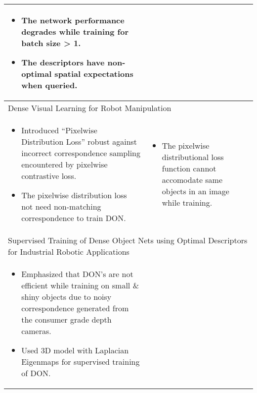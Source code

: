 \begin{longtable}{|p{7cm}|p{7cm}|}
\begin{itemize}
                                                                                                  \item The network performance degrades while training for batch size > 1.
                                                                                                  \item The descriptors have non-optimal spatial expectations when queried.
                                                                                              \end{itemize}                                                          \\ \hline
    \multicolumn{2}{m{14cm}}{\centering Dense Visual Learning for Robot Manipulation\cite{florence2020dense}}                                                                                                                   \\ \hline
    \begin{itemize}
        \itemsep0em
        \item Introduced ``Pixelwise Distribution Loss'' robust against incorrect correspondence sampling encountered by pixelwise contrastive loss.
        \item The pixelwise distribution loss not need non-matching correspondence to train \ac{DON}.
    \end{itemize}                             & \begin{itemize}
                                                    \itemsep0em
                                                    \item The pixelwise distributional loss function cannot accomodate same objects in an image while training.
                                                \end{itemize}                                                                      \\ \hline
    \multicolumn{2}{m{14cm}}{\centering Supervised Training of Dense Object Nets using Optimal Descriptors for Industrial Robotic Applications\cite{kupcsik2021supervised}}                                                     \\ \hline
    \begin{itemize}
        \itemsep0em
        \item Emphasized that \ac{DON}'s are not efficient while training on small \& shiny objects due to noisy correspondence generated from the consumer grade depth cameras.
        \item Used 3D model with Laplacian Eigenmaps for supervised training of \ac{DON}.

\end{itemize}
\end{longtable}
